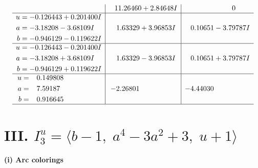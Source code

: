 \documentclass[1p]{elsarticle_modified}
\theoremstyle{definition}
\begin{document}
$$\begin{array}{c|c|c}
 & \phantom{-}11.26460 + 2.84648 I & \phantom{-0.000000 } 0 \\ \hline\begin{aligned}
u &= -0.126443 + 0.201400 I \\
a &= -3.18208 - 3.68109 I \\
b &= -0.946129 - 0.119622 I\end{aligned}
 & \phantom{-}1.63329 + 3.96853 I & \phantom{-}0.10651 - 3.79787 I \\ \hline\begin{aligned}
u &= -0.126443 - 0.201400 I \\
a &= -3.18208 + 3.68109 I \\
b &= -0.946129 + 0.119622 I\end{aligned}
 & \phantom{-}1.63329 - 3.96853 I & \phantom{-}0.10651 + 3.79787 I \\ \hline\begin{aligned}
u &= \phantom{-}0.149808\phantom{ +0.000000I} \\
a &= \phantom{-}7.59187\phantom{ +0.000000I} \\
b &= \phantom{-}0.916645\phantom{ +0.000000I}\end{aligned}
 & -2.26801\phantom{ +0.000000I} & -4.44030\phantom{ +0.000000I}\\
 \hline 
 \end{array}$$\newpage\newpage\renewcommand{\arraystretch}{1}
\centering \section*{III. $I^u_{3}= \langle b-1,\;a^4-3 a^2+3,\;u+1 \rangle$}
\flushleft \textbf{(i) Arc colorings}\\
\end{document}
